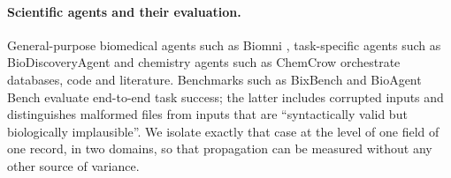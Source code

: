 \paragraph{Scientific agents and their evaluation.}
General-purpose biomedical agents such as Biomni \citep{huang2025biomni}, task-specific agents such as BioDiscoveryAgent \citep{roohani2024biodiscovery} and chemistry agents such as ChemCrow \citep{bran2024chemcrow} orchestrate databases, code and literature. Benchmarks such as BixBench \citep{mitchener2025bixbench} and BioAgent Bench \citep{fa2026bioagent} evaluate end-to-end task success; the latter includes corrupted inputs and distinguishes malformed files from inputs that are ``syntactically valid but biologically implausible''. We isolate exactly that case at the level of one field of one record, in two domains, so that propagation can be measured without any other source of variance.
